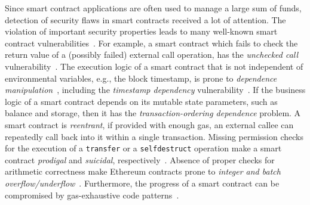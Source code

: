 Since smart contract applications are often used to manage a large sum of funds, detection of
security flaws in smart contracts received a lot of attention.
The violation of important security properties leads to many well-known smart contract
vulnerabilities~\cite{tolmach2020survey}.
For example, a smart contract which fails to check the return value of a (possibly failed) external
call operation, has the \emph{unchecked call}
vulnerability~\cite{grishchenko2018semantic,Perez2019}.
The execution logic of a smart contract that is not independent of environmental variables,
e.g., the block timestamp, is prone to \emph{dependence manipulation}~\cite{Wang2019payment},
including the \emph{timestamp dependency} vulnerability~\cite{luu2016making}.
If the business logic of a smart contract depends on its mutable state parameters, such as balance
and storage, then it has the \emph{transaction-ordering dependence} problem.
A smart contract is \emph{reentrant}, if provided with enough gas, an external callee can
repeatedly call back into it within a single transaction.
Missing permission checks for the execution of a \texttt{transfer} or a \texttt{selfdestruct}
operation make a smart contract \emph{prodigal} and \emph{suicidal},
respectively~\cite{nikolic2018finding}.
Absence of proper checks for arithmetic correctness make Ethereum contracts prone to
\emph{integer and batch overflow/underflow}~\cite{So2019,feng2019precise}.
Furthermore, the progress of a smart contract can be compromised by gas-exhaustive code
patterns~\cite{Chen2017,grech2018madmax}.

